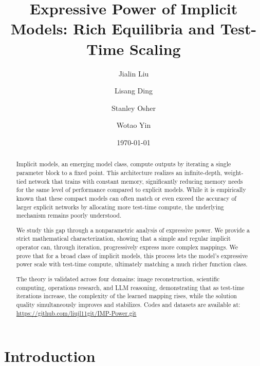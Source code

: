 \documentclass{amsart} %
\title[Expressive Power of Implicit Models]{Expressive Power of Implicit Models: Rich Equilibria and Test-Time Scaling}
\author{Jialin Liu}
\author{Lisang Ding}
\author{Stanley Osher}
\author{Wotao Yin}
\date{\today}
\theoremstyle{definition}
\theoremstyle{remark}
\begin{document}
\begin{abstract}
Implicit models, an emerging model class, compute outputs by iterating a single parameter block to a fixed point. This architecture realizes an infinite-depth, weight-tied network that trains with constant memory, significantly reducing memory needs for the same level of performance compared to explicit models. While it is empirically known that these compact models can often match or even exceed the accuracy of larger explicit networks by allocating more test-time compute, the underlying mechanism remains poorly understood.

We study this gap through a nonparametric analysis of expressive power. We provide a strict mathematical characterization, showing that a simple and regular implicit operator can, through iteration, progressively express more complex mappings. We prove that for a broad class of implicit models, this process lets the model's expressive power scale with test-time compute, ultimately matching a much richer function class.

The theory is validated across four domains: image reconstruction, scientific computing, operations research, and LLM reasoning, demonstrating that as test-time iterations increase, the complexity of the learned mapping rises, while the solution quality simultaneously improves and stabilizes. Codes and datasets are available at: \url{https://github.com/liujl11git/IMP-Power.git}
\end{abstract}

\maketitle

\section{Introduction}
\label{sec:intro}
\end{document}
